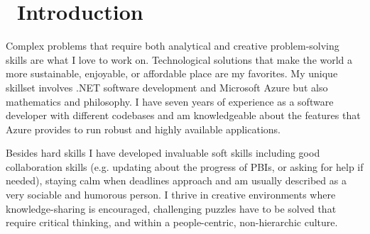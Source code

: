 \documentclass[a4paper,8pt]{article}
\begin{document}
\section{\faUser\ Introduction}
Complex problems that require both analytical and creative problem-solving skills are what I love to work on.
Technological solutions that make the world a more sustainable, enjoyable, or affordable place are my favorites. My unique skillset involves .NET software development and Microsoft Azure but also mathematics and philosophy. I have seven years of experience as a software developer with different codebases and am knowledgeable about the features that Azure provides to run robust and highly available applications. 

\noindent
Besides hard skills I have developed invaluable soft skills including good collaboration skills (e.g. updating about the progress of PBIs, or asking for help if needed), staying calm when deadlines approach and am usually described as a very sociable and humorous person. I thrive in creative environments where knowledge-sharing is encouraged, challenging puzzles have to be solved that require critical thinking, and within a people-centric, non-hierarchic culture.
\end{document}
